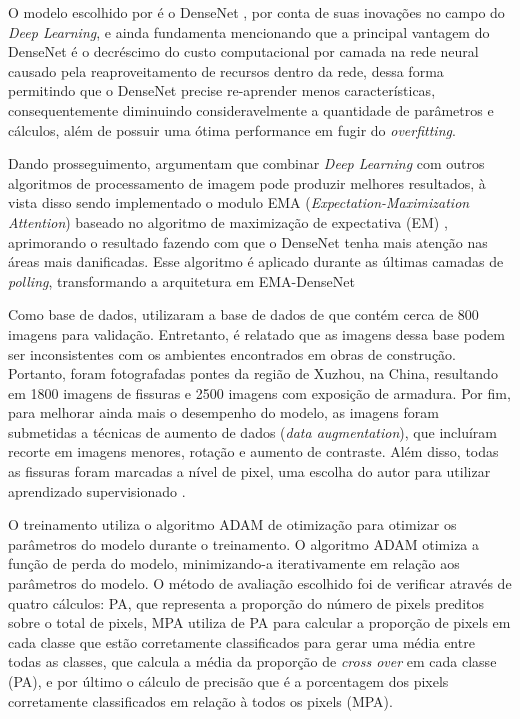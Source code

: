 O modelo escolhido por  é o DenseNet \cite{huang2017densely}, por conta de suas inovações no campo do \textit{Deep Learning}, e ainda fundamenta mencionando que a principal vantagem do DenseNet é o decréscimo do custo computacional por camada na rede neural causado pela reaproveitamento de recursos dentro da rede, dessa forma permitindo que o DenseNet precise re-aprender menos características, consequentemente diminuindo consideravelmente a quantidade de parâmetros e cálculos, além de possuir uma ótima performance em fugir do \textit{overfitting}.

Dando prosseguimento,  argumentam que combinar \textit{Deep Learning} com outros algoritmos de processamento de imagem pode produzir melhores resultados, à vista disso sendo implementado o modulo EMA (\textit{Expectation-Maximization Attention}) baseado no algoritmo de maximização de expectativa (EM) \cite{li2019expectation}, aprimorando o resultado fazendo com que o DenseNet tenha mais atenção nas áreas mais danificadas. 
Esse algoritmo é aplicado durante as últimas camadas de \textit{polling}, transformando a arquitetura em EMA-DenseNet

Como base de dados,  utilizaram a base de dados de  que contém cerca de 800 imagens para validação.
Entretanto, é relatado que as imagens dessa base podem ser inconsistentes com os ambientes encontrados em obras de construção.
Portanto, foram fotografadas pontes da região de Xuzhou, na China, resultando em 1800 imagens de fissuras e  2500 imagens com exposição de armadura.
Por fim, para melhorar ainda mais o desempenho do modelo, as imagens foram submetidas a técnicas de aumento de dados (\textit{data augmentation}), que incluíram recorte em imagens menores, rotação e aumento de contraste. 
Além disso, todas as fissuras foram marcadas a nível de pixel, uma escolha do autor para utilizar aprendizado supervisionado \cite{kim2018automated}.

O treinamento utiliza o algoritmo ADAM de otimização \cite{kingma2014adam} para otimizar os parâmetros do modelo durante o treinamento. 
O algoritmo ADAM otimiza a função de perda do modelo, minimizando-a iterativamente em relação aos parâmetros do modelo.
O método de avaliação escolhido foi de verificar através de quatro cálculos: 
PA, que representa a proporção do número de pixels preditos sobre o total de pixels, 
MPA utiliza de PA para calcular a proporção de pixels em cada classe que estão corretamente classificados para gerar uma média entre todas as classes, 
 que calcula a média da proporção de \textit{cross over} em cada classe (PA), 
e por último o cálculo de precisão que é a porcentagem dos pixels corretamente classificados em relação à todos os pixels (MPA).

